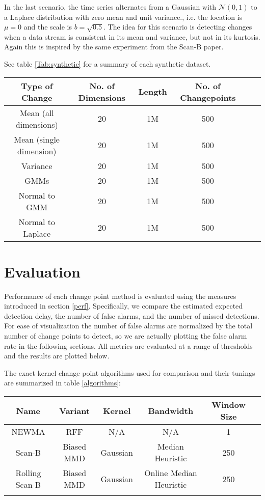 In the last scenario, the time series alternates from a Gaussian with $\mathcal{N}(0,1)$ to a Laplace distribution with zero mean and unit variance., i.e. the location is $\mu=0$ and the scale is $b=\sqrt{0.5}$. The idea for this scenario is detecting changes when a data stream is consistent in its mean and variance, but not in its kurtosis. Again this is inspired by the same experiment from the Scan-B paper.

See table \ref{Tab:synthetic} for a summary of each synthetic dataset.

\begin{center}
\begin{tabular}{SSSSSS} \toprule
    {Type of Change} & {No. of Dimensions} & {Length} & {No. of Changepoints}  \\ \midrule
    {Mean (all dimensions)}  & 20 & {1M} & 500  \\
    {Mean (single dimension)}  & 20 & {1M} & 500  \\
    {Variance}  & 20 & {1M} & 500  \\
    {GMMs}  & 20 & {1M}  & 500  \\ 
    {Normal to GMM}  & 20 & {1M}  & 500  \\ 
    {Normal to Laplace} & 20 & {1M}  & 500  \\ \bottomrule
\end{tabular}
 \label{Tab:synthetic}
\end{center}

\section{Evaluation}
\label{eval}
Performance of each change point method is evaluated using the measures introduced in section \ref{perf}. Specifically, we compare the estimated expected detection delay, the number of false alarms, and the number of missed detections. For ease of visualization the number of false alarms are normalized by the total number of change points to detect, so we are actually plotting the false alarm rate in the following sections. All metrics are evaluated at a range of thresholds and the results are plotted below. 

The exact kernel change point algorithms used for comparison and their tunings are summarized in table \ref{algorithms}:

\begin{center}
\begin{tabular}{SSSSSS} \toprule
    {Name} & {Variant} & {Kernel} & {Bandwidth} & {Window Size}\\ \midrule
    {NEWMA}  & {RFF} & {N/A} & {N/A} & 1  \\
    {Scan-B}  & {Biased MMD}  & {Gaussian} & {Median Heuristic} & 250   \\
    {Rolling Scan-B} & {Biased MMD}   & {Gaussian} & {Online Median Heuristic}  & 250  \\ \bottomrule
\label{algorithms}
\end{tabular}
\end{center}

